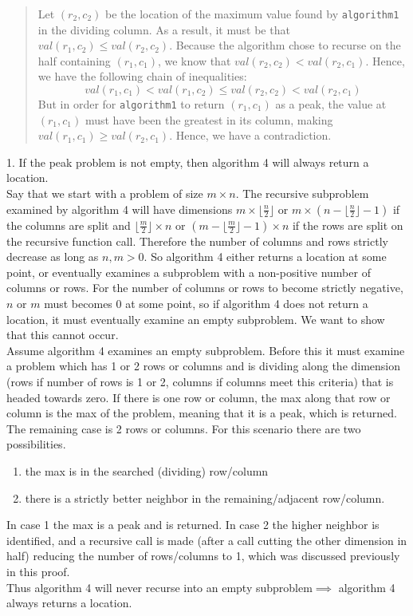 \documentclass[12pt,twoside]{article}
\begin{document}
\begin{problems}
\begin{quote}
Let $(r_2, c_2)$ be
the location of the maximum value found by \texttt{algorithm1}
in the dividing column.
As a result, it must be that $val(r_1, c_2) \le val(r_2, c_2)$.
Because the algorithm chose to recurse
on the half containing $(r_1, c_1)$,
we know that $val(r_2, c_2) < val(r_2, c_1)$.
Hence, we have the following chain of inequalities:
$$val(r_1, c_1) < val(r_1, c_2) \le val(r_2, c_2) < val(r_2, c_1)$$
But in order for \texttt{algorithm1} to return $(r_1, c_1)$ as a peak,
the value at $(r_1, c_1)$ must have been the greatest in its column,
making $val(r_1, c_1) \ge val(r_2, c_1)$.
Hence, we have a contradiction.
\end{quote}

\ifsolution \solution{}
1. If the peak problem is not empty, then algorithm 4 will always return a location.
\\Say that we start with a problem of size $m \times n$.  The recursive subproblem examined by algorithm 4 will have dimensions $m \times \lfloor \frac{n}{2} \rfloor$ or $m \times ( n - \lfloor\frac{n}{2} \rfloor -1 )$ if the columns are split and $ \lfloor \frac{m}{2} \rfloor \times n$ or  $( m - \lfloor\frac{m}{2} \rfloor -1 ) \times n$ if the rows are split on the recursive function call.  Therefore the number of columns and rows strictly decrease as long as $n,m>0$.  So algorithm 4 either returns a location at some point, or eventually examines a subproblem with a non-positive number of columns or rows.  For the number of columns or rows to become strictly negative, $n$ or $m$ must becomes 0 at some point, so if algorithm 4 does not return a location, it must eventually examine an empty subproblem.  We want to show that this cannot occur.\\
Assume algorithm 4 examines an empty subproblem.  Before this it must examine a problem which has 1 or 2 rows or columns and is dividing along the dimension (rows if number of rows is 1 or 2, columns if columns meet this criteria) that is headed towards zero.  If there is one row or column, the max along that row or column is the max of the problem, meaning that it is a peak, which is returned.  The remaining case is 2 rows or columns.  For this scenario there are two possibilities.
\begin{enumerate}
\item{the max is in the searched (dividing) row/column}
\item{there is a strictly better neighbor in the remaining/adjacent row/column.}
\end{enumerate}
In case 1 the max is a peak and is returned.  In case 2 the higher neighbor is identified, and a recursive call is made (after a call cutting the other dimension in half) reducing the number of rows/columns to 1, which was discussed previously in this proof.
\\Thus algorithm 4 will never recurse into an empty subproblem$\implies$ algorithm 4 always returns a location.


\end{problems}
\end{document}
